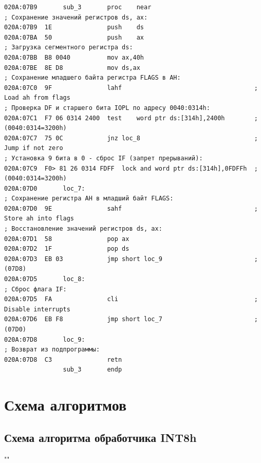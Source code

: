 \documentclass[a4paper,12pt]{article}
\begin{document}
\begin{lstlisting}[style={asm}]
020A:07B9		sub_3		proc	near
; Сохранение значений регистров ds, ax:
020A:07B9  1E				push	ds
020A:07BA  50				push	ax
; Загрузка сегментного регистра ds:
020A:07BB  B8 0040			mov	ax,40h
020A:07BE  8E D8			mov	ds,ax
; Сохранение младшего байта регистра FLAGS в AH:
020A:07C0  9F				lahf				                    ; Load ah from flags
; Проверка DF и старшего бита IOPL по адресу 0040:0314h:
020A:07C1  F7 06 0314 2400	test	word ptr ds:[314h],2400h	    ; (0040:0314=3200h)
020A:07C7  75 0C			jnz	loc_8			                    ; Jump if not zero
; Установка 9 бита в 0 - сброс IF (запрет прерываний):
020A:07C9  F0> 81 26 0314 FDFF	lock and word ptr ds:[314h],0FDFFh	; (0040:0314=3200h)
020A:07D0		loc_7:
; Сохранение регистра AH в младший байт FLAGS:
020A:07D0  9E				sahf				                    ; Store ah into flags
; Восстановление значений регистров ds, ax:
020A:07D1  58				pop	ax
020A:07D2  1F				pop	ds
020A:07D3  EB 03			jmp	short loc_9		                    ; (07D8)
020A:07D5		loc_8:
; Сброс флага IF:
020A:07D5  FA				cli				                        ; Disable interrupts
020A:07D6  EB F8			jmp	short loc_7		                    ; (07D0)
020A:07D8		loc_9:
; Возврат из подпрограммы:
020A:07D8  C3				retn
				sub_3	    endp
\end{lstlisting}
\clearpage

\section{Схема алгоритмов}

\subsection{Схема алгоритма обработчика INT8h}
""\newline
\end{document}
